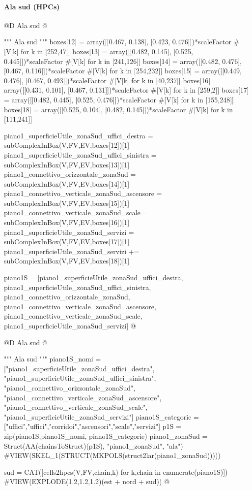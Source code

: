 \documentclass[11pt,oneside]{article}    %
\begin{document}
\paragraph{Ala sud (HPCs)}
@D Ala sud
@{""" Ala sud """
boxes[12] = array([[0.467, 0.138], [0.423, 0.476]])*scaleFactor #[V[k] for k in [252,47]]
boxes[13] = array([[0.482, 0.145], [0.525, 0.445]])*scaleFactor #[V[k] for k in [241,126]]
boxes[14] = array([[0.482, 0.476], [0.467, 0.116]])*scaleFactor #[V[k] for k in [254,232]]
boxes[15] = array([[0.449, 0.476], [0.467, 0.493]])*scaleFactor #[V[k] for k in [40,237]]
boxes[16] = array([[0.431, 0.101], [0.467, 0.131]])*scaleFactor #[V[k] for k in [259,2]]
boxes[17] = array([[0.482, 0.445], [0.525, 0.476]])*scaleFactor #[V[k] for k in [155,248]]
boxes[18] = array([[0.525, 0.104], [0.482, 0.145]])*scaleFactor #[V[k] for k in [111,241]]

piano1_superficieUtile_zonaSud_uffici_destra = subComplexInBox(V,FV,EV,boxes[12])[1]
piano1_superficieUtile_zonaSud_uffici_sinistra = subComplexInBox(V,FV,EV,boxes[13])[1]
piano1_connettivo_orizzontale_zonaSud = subComplexInBox(V,FV,EV,boxes[14])[1]
piano1_connettivo_verticale_zonaSud_ascensore = subComplexInBox(V,FV,EV,boxes[15])[1]
piano1_connettivo_verticale_zonaSud_scale = subComplexInBox(V,FV,EV,boxes[16])[1]
piano1_superficieUtile_zonaSud_servizi = subComplexInBox(V,FV,EV,boxes[17])[1]
piano1_superficieUtile_zonaSud_servizi += subComplexInBox(V,FV,EV,boxes[18])[1]

piano1S = [piano1_superficieUtile_zonaSud_uffici_destra, piano1_superficieUtile_zonaSud_uffici_sinistra, piano1_connettivo_orizzontale_zonaSud, piano1_connettivo_verticale_zonaSud_ascensore, piano1_connettivo_verticale_zonaSud_scale, piano1_superficieUtile_zonaSud_servizi]
@}

@D Ala sud
@{""" Ala sud """
piano1S_nomi = ["piano1_superficieUtile_zonaSud_uffici_destra", "piano1_superficieUtile_zonaSud_uffici_sinistra", "piano1_connettivo_orizzontale_zonaSud", "piano1_connettivo_verticale_zonaSud_ascensore", "piano1_connettivo_verticale_zonaSud_scale", "piano1_superficieUtile_zonaSud_servizi"]
piano1S_categorie = ["uffici","uffici","corridoi","ascensori","scale","servizi"]
p1S = zip(piano1S,piano1S_nomi, piano1S_categorie)
piano1_zonaSud = Struct(AA(chainsToStruct)(p1S), "piano1_zonaSud", "ala")
#VIEW(SKEL_1(STRUCT(MKPOLS(struct2lar(piano1_zonaSud)))))
    
sud = CAT([cells2hpcs(V,FV,chain,k) for k,chain in enumerate(piano1S)])
#VIEW(EXPLODE(1.2,1.2,1.2)(est + nord + sud))
@}
\end{document}
